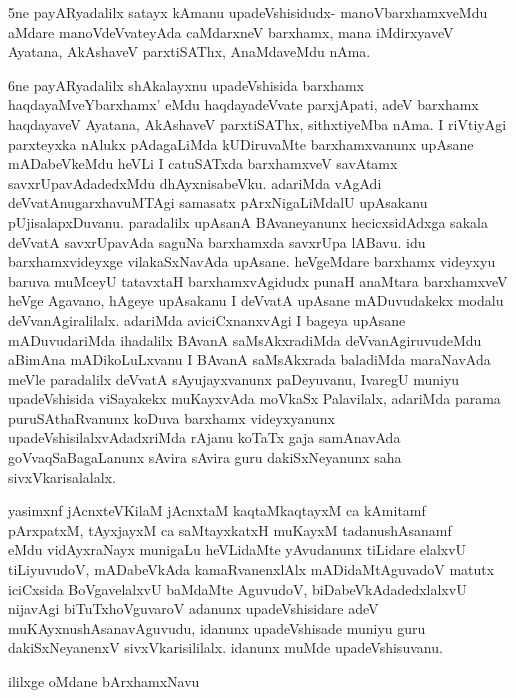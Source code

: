 \begin{artha}
5ne payARyadalilx satayx kAmanu upadeVshisidudx- manoVbarxhamxveMdu aMdare manoVdeVvateyAda caMdarxneV barxhamx, mana iMdirxyaveV Ayatana, AkAshaveV parxtiSAThx, AnaMdaveMdu nAma. 
\end{artha}

\begin{artha}
6ne payARyadalilx shAkalayxnu upadeVshisida barxhamx haqdayaMveYbarxhamx' eMdu haqdayadeVvate parxjApati, adeV barxhamx haqdayaveV Ayatana, AkAshaveV parxtiSAThx, sithxtiyeMba nAma. I riVtiyAgi parxteyxka nAlukx pAdagaLiMda kUDiruvaMte barxhamxvanunx upAsane mADabeVkeMdu heVLi I catuSATxda barxhamxveV savAtamx savxrUpavAdadedxMdu dhAyxnisabeVku. adariMda vAgAdi deVvatAnugarxhavuMTAgi samasatx pArxNigaLiMdalU upAsakanu pUjisalapxDuvanu. paradalilx upAsanA BAvaneyanunx hecicxsidAdxga sakala deVvatA savxrUpavAda saguNa barxhamxda savxrUpa lABavu. idu barxhamxvideyxge vilakaSxNavAda upAsane. heVgeMdare barxhamx videyxyu baruva muMceyU tatavxtaH barxhamxvAgidudx punaH anaMtara barxhamxveV heVge Agavano, hAgeye upAsakanu I deVvatA upAsane mADuvudakekx modalu deVvanAgiralilalx. adariMda aviciCxnanxvAgi I bageya upAsane mADuvudariMda ihadalilx BAvanA saMsAkxradiMda deVvanAgiruvudeMdu aBimAna mADikoLuLxvanu I BAvanA saMsAkxrada baladiMda maraNavAda meVle paradalilx deVvatA sAyujayxvanunx paDeyuvanu, IvaregU muniyu upadeVshisida viSayakekx muKayxvAda moVkaSx Palavilalx, adariMda parama puruSAthaRvanunx koDuva barxhamx videyxyanunx upadeVshisilalxvAdadxriMda rAjanu koTaTx gaja samAnavAda goVvaqSaBagaLanunx sAvira sAvira guru dakiSxNeyanunx saha sivxVkarisalalalx. 
\end{artha}%


\begin{artha}
yasimxnf jAcnxteV\s KilaM jAcnxtaM kaqtaMkaqtayxM ca kAmitamf \\
pArxpatxM, tAyxjayxM ca saMtayxkatxH muKayxM tadanushAsanamf \\ eMdu vidAyxraNayx munigaLu heVLidaMte yAvudanunx tiLidare elalxvU tiLiyuvudoV, mADabeVkAda kamaRvanenxlAlx mADidaMtAguvadoV matutx iciCxsida BoVgavelalxvU baMdaMte AguvudoV, biDabeVkAdadedxlalxvU nijavAgi biTuTxhoVguvaroV adanunx upadeVshisidare adeV muKAyxnushAsanavAguvudu, idanunx upadeVshisade muniyu guru dakiSxNeyanenxV sivxVkarisililalx. idanunx muMde upadeVshisuvanu. 
\end{artha}

\begin{center}
ililxge oMdane bArxhamxNavu
\end{center}

